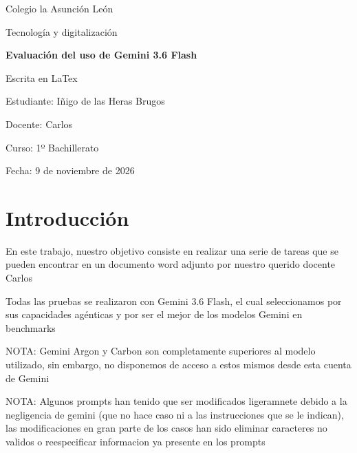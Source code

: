 \documentclass[12pt,a4paper]{article}
\begin{document}
\begin{titlepage}
  \thispagestyle{empty}
  \centering
  \vspace*{2cm}
  {\Large Colegio la Asunción León\par}
  \vspace{1cm}
  {\large Tecnología y digitalización\par}
  \vspace{2cm}
  {\Huge\bfseries Evaluación del uso de Gemini 3.6 Flash\par}
  \vspace{1cm}
  {\large Escrita en LaTex\par}
  \vfill
  {\large Estudiante: Iñigo de las Heras Brugos\par}
  {\large Docente: Carlos\par}
  {\large Curso: 1º Bachillerato\par}
  \vspace{0.5cm}
  {\large Fecha: 9 de noviembre de 2026\par}
  \vspace*{2cm}
\end{titlepage}

\renewcommand{\contentsname}{Índice}
\tableofcontents
\newpage


\section*{Introducción}

En este trabajo, nuestro objetivo consiste en realizar una serie de tareas que se
pueden encontrar en un documento word adjunto por nuestro querido docente Carlos

Todas las pruebas se realizaron con Gemini 3.6 Flash, el cual seleccionamos por
sus capacidades agénticas y por ser el mejor de los modelos Gemini en benchmarks

NOTA: Gemini Argon y Carbon son completamente superiores al modelo utilizado, sin embargo, no disponemos de acceso a estos mismos desde esta cuenta de Gemini

NOTA: Algunos prompts han tenido que ser modificados ligeramnete debido a la negligencia de gemini (que no hace caso ni a las instrucciones que se le indican), las modificaciones en gran parte de los casos han sido eliminar caracteres no validos o reespecificar informacion ya presente en los prompts
\end{document}
